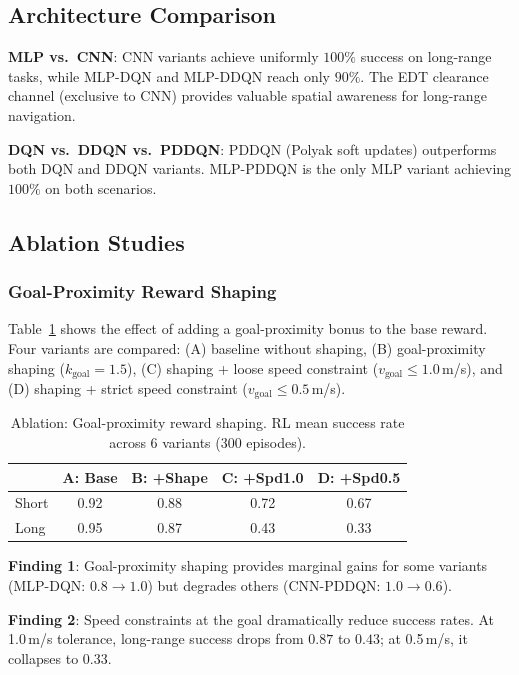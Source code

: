 \documentclass[conference]{IEEEtran}
\begin{document}
\subsection{Architecture Comparison}

\textbf{MLP vs.\ CNN}: CNN variants achieve uniformly $100\%$ success on long-range tasks, while MLP-DQN and MLP-DDQN reach only $90\%$.
The EDT clearance channel (exclusive to CNN) provides valuable spatial awareness for long-range navigation.

\textbf{DQN vs.\ DDQN vs.\ PDDQN}: PDDQN (Polyak soft updates) outperforms both DQN and DDQN variants.
MLP-PDDQN is the only MLP variant achieving $100\%$ on both scenarios.

\subsection{Ablation Studies}\label{sec:ablation}

\subsubsection{Goal-Proximity Reward Shaping}

Table~\ref{tab:ablation_shaping} shows the effect of adding a goal-proximity bonus to the base reward.
Four variants are compared: (A) baseline without shaping, (B) goal-proximity shaping ($k_{\text{goal}} = 1.5$), (C) shaping + loose speed constraint ($v_{\text{goal}} \leq 1.0$\,m/s), and (D) shaping + strict speed constraint ($v_{\text{goal}} \leq 0.5$\,m/s).

\begin{table}[t]
\centering
\caption{Ablation: Goal-proximity reward shaping. RL mean success rate across 6 variants (300 episodes).}
\label{tab:ablation_shaping}
\footnotesize
\begin{tabular}{@{}lcccc@{}}
\toprule
& \textbf{A: Base} & \textbf{B: +Shape} & \textbf{C: +Spd1.0} & \textbf{D: +Spd0.5} \\
\midrule
Short & 0.92 & 0.88 & 0.72 & 0.67 \\
Long  & 0.95 & 0.87 & 0.43 & 0.33 \\
\bottomrule
\end{tabular}
\end{table}

\textbf{Finding 1}: Goal-proximity shaping provides marginal gains for some variants (MLP-DQN: $0.8 \to 1.0$) but degrades others (CNN-PDDQN: $1.0 \to 0.6$).

\textbf{Finding 2}: Speed constraints at the goal dramatically reduce success rates.
At 1.0\,m/s tolerance, long-range success drops from $0.87$ to $0.43$; at 0.5\,m/s, it collapses to $0.33$.
\end{document}
